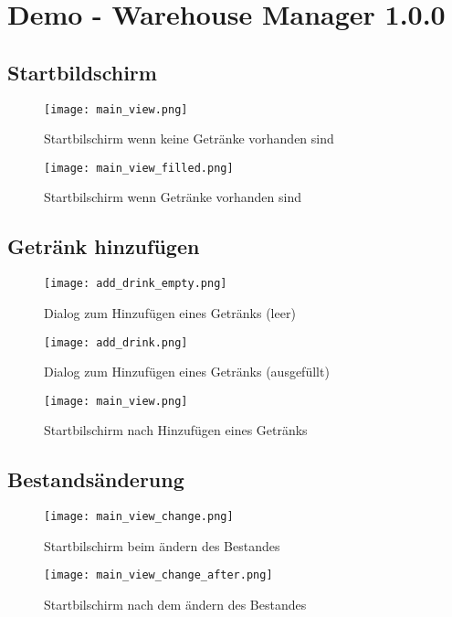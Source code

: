 \chapter{Demo - Warehouse Manager 1.0.0}

\section{Startbildschirm}

\begin{figure}[h!]
    \texttt{[image: main\_view.png]}
    \caption{Startbilschirm wenn keine Getränke vorhanden sind}
    \label{fig:main_view}
\end{figure}

\begin{figure}[h!]
    \texttt{[image: main\_view\_filled.png]}
    \caption{Startbilschirm wenn Getränke vorhanden sind}
    \label{fig:main_view_filled}
\end{figure}

\clearpage

\section{Getränk hinzufügen}

\begin{figure}[h!]
    \texttt{[image: add\_drink\_empty.png]}
    \caption{Dialog zum Hinzufügen eines Getränks (leer)}
    \label{fig:add_drink_empty}
\end{figure}

\begin{figure}[h!]
    \texttt{[image: add\_drink.png]}
    \caption{Dialog zum Hinzufügen eines Getränks (ausgefüllt)}
    \label{fig:add_drink}
\end{figure}

\begin{figure}[h!]
    \texttt{[image: main\_view.png]}
    \caption{Startbilschirm nach Hinzufügen eines Getränks}
    \label{fig:main_view}
\end{figure}

\clearpage

\section{Bestandsänderung}


\begin{figure}[h!]
    \texttt{[image: main\_view\_change.png]}
    \caption{Startbilschirm beim ändern des Bestandes}
    \label{fig:main_view_change}
\end{figure}

\begin{figure}[h!]
    \texttt{[image: main\_view\_change\_after.png]}
    \caption{Startbilschirm nach dem ändern des Bestandes}
    \label{fig:main_view_change_after}
\end{figure}